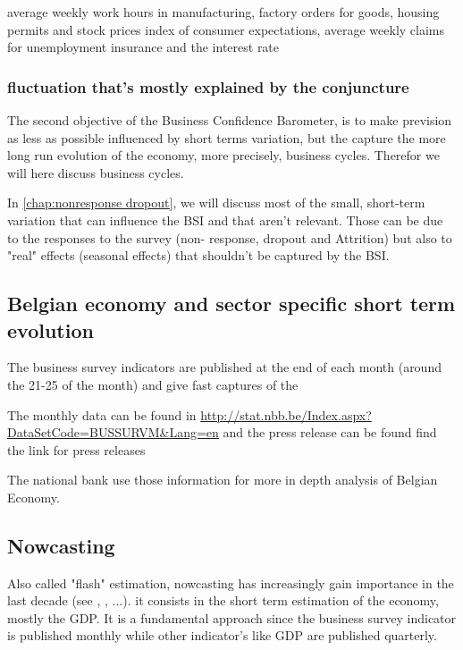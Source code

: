 \documentclass[12pt,a4paper,oneside]{book}
\begin{document}
average weekly work hours in manufacturing, factory orders for goods, housing permits and stock prices
 index of consumer expectations, average weekly claims for unemployment insurance and the interest rate
 

\subsubsection{fluctuation that's mostly explained by the conjuncture}
The second objective of the Business Confidence Barometer, is to make prevision as less as possible influenced by short terms variation, but the capture the more long run evolution of the economy, more precisely, business cycles. Therefor we will here discuss business cycles.

In \autoref{chap:nonresponse dropout}, we will discuss most of the small, short-term variation that can influence the BSI and that aren't relevant. Those can be due to the responses to the survey (non- response, dropout and Attrition) but also to "real" effects (seasonal effects) that shouldn't be captured by the BSI.

\subsection{Belgian economy and sector specific short term evolution}


The business survey indicators are published at the end of each month (around the 21-25 of the month) and give fast captures of the 

The monthly data can be found in \url{http://stat.nbb.be/Index.aspx?DataSetCode=BUSSURVM&Lang=en} and the press release can be found find the link for press releases

The national bank use those information for more in depth analysis of Belgian Economy.


\subsection{Nowcasting}

Also called "flash" estimation, nowcasting has increasingly gain importance in the last decade (see \cite{foroni_comparison_2014}, \cite{de_antonio_liedo_nowcasting_2014}, ...).
it consists in the short term estimation of the economy, mostly the GDP.
It is a fundamental approach since the business survey indicator is published monthly while other indicator's like GDP are published quarterly.
\end{document}
